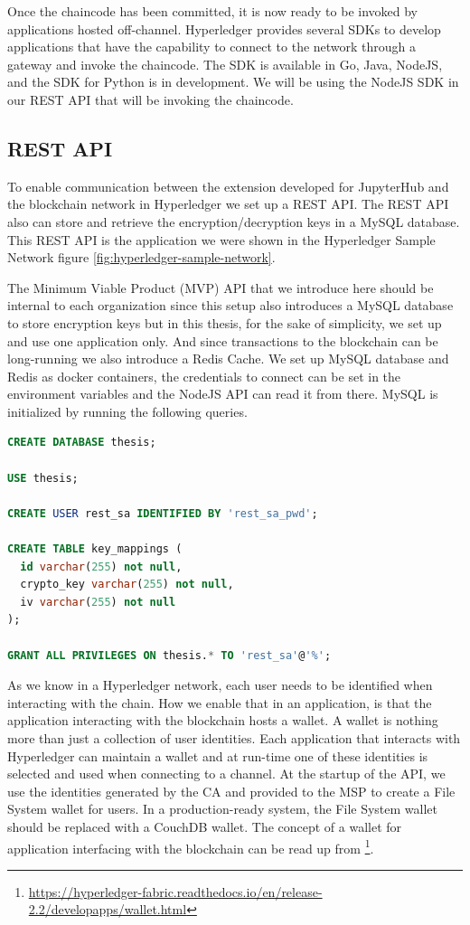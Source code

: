 \bigskip
Once the chaincode has been committed, it is now ready to be invoked by applications hosted off-channel. Hyperledger provides several SDKs to develop applications that have the capability to connect to the network through a gateway and invoke the chaincode. The SDK is available in Go, Java, NodeJS, and the SDK for Python is in development. We will be using the NodeJS SDK in our REST API that will be invoking the chaincode.

\subsection{REST API}
To enable communication between the extension developed for JupyterHub and the blockchain network in Hyperledger we set up a REST API. The REST API also can store and retrieve the encryption/decryption keys in a MySQL database. This REST API is the application we were shown in the Hyperledger Sample Network figure \ref{fig:hyperledger-sample-network}.

\bigskip
The Minimum Viable Product (MVP) API that we introduce here should be internal to each organization since this setup also introduces a MySQL database to store encryption keys but in this thesis, for the sake of simplicity, we set up and use one application only. And since transactions to the blockchain can be long-running we also introduce a Redis Cache. We set up MySQL database and Redis as docker containers, the credentials to connect can be set in the environment variables and the NodeJS API can read it from there. MySQL is initialized by running the following queries.

\begin{lstlisting}[language=SQL,caption={Database initialization queries to create user, database and table consumed by the application}]
CREATE DATABASE thesis;

USE thesis;

CREATE USER rest_sa IDENTIFIED BY 'rest_sa_pwd';  

CREATE TABLE key_mappings (
  id varchar(255) not null,
  crypto_key varchar(255) not null,
  iv varchar(255) not null
);

GRANT ALL PRIVILEGES ON thesis.* TO 'rest_sa'@'%';
\end{lstlisting}

\bigskip
As we know in a Hyperledger network, each user needs to be identified when interacting with the chain. How we enable that in an application, is that the application interacting with the blockchain hosts a wallet. A wallet is nothing more than just a collection of user identities. Each application that interacts with Hyperledger can maintain a wallet and at run-time one of these identities is selected and used when connecting to a channel. At the startup of the API, we use the identities generated by the CA and provided to the MSP to create a File System wallet for users. In a production-ready system, the File System wallet should be replaced with a CouchDB wallet. The concept of a wallet for application interfacing with the blockchain can be read up from \footnote{\url{https://hyperledger-fabric.readthedocs.io/en/release-2.2/developapps/wallet.html}}.

